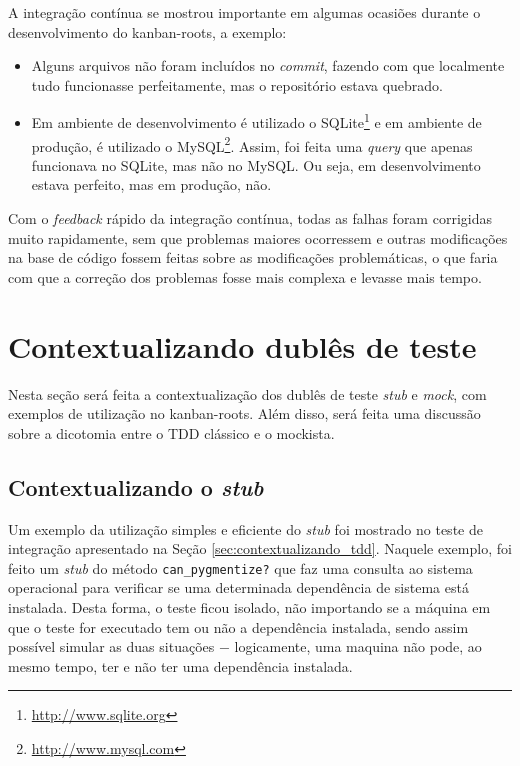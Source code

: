 A integração contínua se mostrou importante em algumas ocasiões durante o desenvolvimento do kanban-roots, a exemplo:

\begin{itemize}
  \item Alguns arquivos não foram incluídos no \textit{commit}, fazendo com que localmente tudo funcionasse perfeitamente, mas o repositório estava quebrado.
  \item Em ambiente de desenvolvimento é utilizado o SQLite\footnote{\url{http://www.sqlite.org}} e em ambiente de produção, é utilizado o MySQL\footnote{\url{http://www.mysql.com}}. Assim, foi feita uma \textit{query} que apenas funcionava no SQLite, mas não no MySQL. Ou seja, em desenvolvimento estava perfeito, mas em produção, não.
\end{itemize}

Com o \textit{feedback} rápido da integração contínua, todas as falhas foram corrigidas muito rapidamente, sem que problemas maiores ocorressem e outras modificações na base de código fossem feitas sobre as modificações problemáticas, o que faria com que a correção dos problemas fosse mais complexa e levasse mais tempo.


\section{Contextualizando dublês de teste}

Nesta seção será feita a contextualização dos dublês de teste \textit{stub} e \textit{mock}, com exemplos de utilização no kanban-roots. Além disso, será feita uma discussão sobre a dicotomia entre o TDD clássico e o mockista.

\subsection{Contextualizando o \textit{stub}}
\label{sub:contextualizando_o_stub}

Um exemplo da utilização simples e eficiente do \textit{stub} foi mostrado no teste de integração apresentado na Seção \ref{sec:contextualizando_tdd}. Naquele exemplo, foi feito um \textit{stub} do método \texttt{can\_pygmentize?} que faz uma consulta ao sistema operacional para verificar se uma determinada dependência de sistema está instalada. Desta forma, o teste ficou isolado, não importando se a máquina em que o teste for executado tem ou não a dependência instalada, sendo assim possível simular as duas situações $-$ logicamente, uma maquina não pode, ao mesmo tempo, ter e não ter uma dependência instalada.

